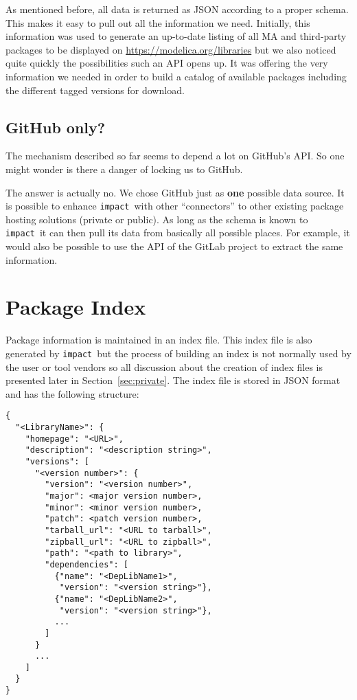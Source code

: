 \documentclass[11pt,a4paper,twocolumn]{article}
\newcommand{\impact}{\texttt{impact}} %
\begin{document}
As mentioned before, all data is returned as JSON according to a
proper schema.  This makes it easy to pull out all the information we
need.  Initially, this information was used to generate an up-to-date
listing of all MA and third-party packages to be displayed on
\url{https://modelica.org/libraries} but we also noticed quite quickly
the possibilities such an API opens up.  It was offering the very
information we needed in order to build a catalog of available
packages including the different tagged versions for download.

\subsection{GitHub only?}
\label{sec:gh-only}
The mechanism described so far seems to depend a lot on GitHub's API.
So one might wonder is there a danger of locking us to GitHub.

The answer is actually no. We chose GitHub just as \textbf{one}
possible data source.  It is possible to enhance \impact\ with other
``connectors'' to other existing package hosting solutions (private or
public).  As long as the schema is known to \impact\ it can then pull
its data from basically all possible places.  For example, it would
also be possible to use the API of the GitLab project\cite{gl-api} to
extract the same information.

\section{Package Index}
\label{sec:index}

Package information is maintained in an index file.  This index file
is also generated by \impact\ but the process of building an index is
not normally used by the user or tool vendors so all discussion about
the creation of index files is presented later in
Section~\ref{sec:private}.  The index file is stored in JSON format
and has the following structure:

{\footnotesize
\begin{verbatim}
{
  "<LibraryName>": {
    "homepage": "<URL>",
    "description": "<description string>",
    "versions": [
      "<version number>": {
        "version": "<version number>",
        "major": <major version number>,
        "minor": <minor version number>,
        "patch": <patch version number>,
        "tarball_url": "<URL to tarball>",
        "zipball_url": "<URL to zipball>",
        "path": "<path to library>",
        "dependencies": [
          {"name": "<DepLibName1>",
           "version": "<version string>"},
          {"name": "<DepLibName2>",
           "version": "<version string>"},
          ...
        ]
      }
      ...
    ]
  }
}
\end{verbatim}
}
\end{document}
